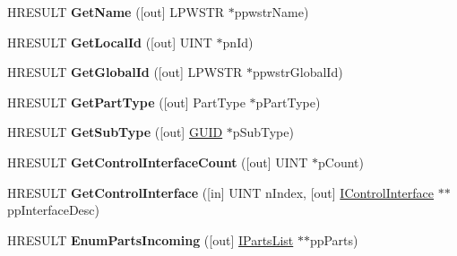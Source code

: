 \begin{DoxyCompactItemize}
\item 
\mbox{\label{interface_i_part_a288dfc5d3f06a0cfdd11569692fc9a28}} 
H\+R\+E\+S\+U\+LT {\bfseries Get\+Name} (\mbox{[}out\mbox{]} L\+P\+W\+S\+TR $\ast$ppwstr\+Name)
\item 
\mbox{\label{interface_i_part_a1fdfc0adac4b8a5316bb1e49d2e7945c}} 
H\+R\+E\+S\+U\+LT {\bfseries Get\+Local\+Id} (\mbox{[}out\mbox{]} U\+I\+NT $\ast$pn\+Id)
\item 
\mbox{\label{interface_i_part_aa9ef57211c1e482cab96cb2ff0f652a9}} 
H\+R\+E\+S\+U\+LT {\bfseries Get\+Global\+Id} (\mbox{[}out\mbox{]} L\+P\+W\+S\+TR $\ast$ppwstr\+Global\+Id)
\item 
\mbox{\label{interface_i_part_a7b817b87cebd87acb029ff0a9cd483d6}} 
H\+R\+E\+S\+U\+LT {\bfseries Get\+Part\+Type} (\mbox{[}out\mbox{]} Part\+Type $\ast$p\+Part\+Type)
\item 
\mbox{\label{interface_i_part_abfff918bfed52477c6a8985f9aa5d854}} 
H\+R\+E\+S\+U\+LT {\bfseries Get\+Sub\+Type} (\mbox{[}out\mbox{]} \hyperlink{interface_g_u_i_d}{G\+U\+ID} $\ast$p\+Sub\+Type)
\item 
\mbox{\label{interface_i_part_a051e70e18212aad6d3ec80dd20f96b17}} 
H\+R\+E\+S\+U\+LT {\bfseries Get\+Control\+Interface\+Count} (\mbox{[}out\mbox{]} U\+I\+NT $\ast$p\+Count)
\item 
\mbox{\label{interface_i_part_a617eecba4e7edcc9f2fd89e03d7408a1}} 
H\+R\+E\+S\+U\+LT {\bfseries Get\+Control\+Interface} (\mbox{[}in\mbox{]} U\+I\+NT n\+Index, \mbox{[}out\mbox{]} \hyperlink{interface_i_control_interface}{I\+Control\+Interface} $\ast$$\ast$pp\+Interface\+Desc)
\item 
\mbox{\label{interface_i_part_afa190d7bd0c4c167fe607b8b6fef2960}} 
H\+R\+E\+S\+U\+LT {\bfseries Enum\+Parts\+Incoming} (\mbox{[}out\mbox{]} \hyperlink{interface_i_parts_list}{I\+Parts\+List} $\ast$$\ast$pp\+Parts)
\item 
\mbox{\label{interface_i_part_a2bbc7143cf89fa0b5f968b75cfc1be8d}} 

\end{DoxyCompactItemize}
